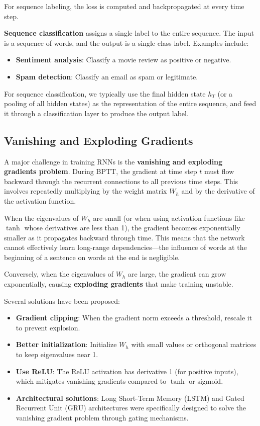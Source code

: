 \documentclass[11pt,a4paper]{article}
\begin{document}
For sequence labeling, the loss is computed and backpropagated at every time step.

\textbf{Sequence classification} assigns a single label to the entire sequence. The input is a sequence of words, and the output is a single class label. Examples include:
\begin{itemize}
    \item \textbf{Sentiment analysis}: Classify a movie review as positive or negative.
    \item \textbf{Spam detection}: Classify an email as spam or legitimate.
\end{itemize}

For sequence classification, we typically use the final hidden state $h_T$ (or a pooling of all hidden states) as the representation of the entire sequence, and feed it through a classification layer to produce the output label.

\subsection{Vanishing and Exploding Gradients}

A major challenge in training RNNs is the \textbf{vanishing and exploding gradients problem}. During BPTT, the gradient at time step $t$ must flow backward through the recurrent connections to all previous time steps. This involves repeatedly multiplying by the weight matrix $W_h$ and by the derivative of the activation function.

When the eigenvalues of $W_h$ are small (or when using activation functions like $\tanh$ whose derivatives are less than 1), the gradient becomes exponentially smaller as it propagates backward through time. This means that the network cannot effectively learn long-range dependencies---the influence of words at the beginning of a sentence on words at the end is negligible.

Conversely, when the eigenvalues of $W_h$ are large, the gradient can grow exponentially, causing \textbf{exploding gradients} that make training unstable.

Several solutions have been proposed:
\begin{itemize}
    \item \textbf{Gradient clipping}: When the gradient norm exceeds a threshold, rescale it to prevent explosion.
    \item \textbf{Better initialization}: Initialize $W_h$ with small values or orthogonal matrices to keep eigenvalues near 1.
    \item \textbf{Use ReLU}: The ReLU activation has derivative 1 (for positive inputs), which mitigates vanishing gradients compared to $\tanh$ or sigmoid.
    \item \textbf{Architectural solutions}: Long Short-Term Memory (LSTM) and Gated Recurrent Unit (GRU) architectures were specifically designed to solve the vanishing gradient problem through gating mechanisms.
\end{itemize}
\end{document}
